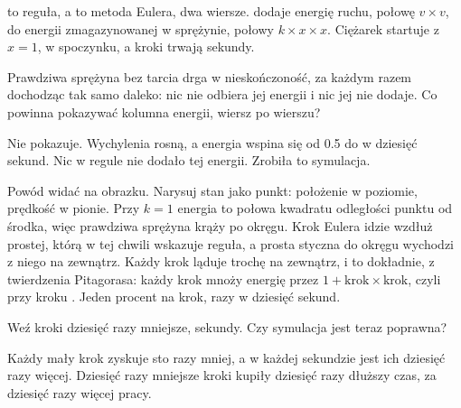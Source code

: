 
\noindent
{} to reguła, a  to metoda Eulera, dwa wiersze.
 dodaje energię ruchu, połowę $v \times v$, do energii
zmagazynowanej w sprężynie, połowy $k \times x \times x$. Ciężarek startuje z
$x = 1$, w spoczynku, a kroki trwają  sekundy.


\begin{think}
Prawdziwa sprężyna bez tarcia drga w nieskończoność, za każdym razem
dochodząc tak samo daleko: nic nie odbiera jej energii i nic jej nie dodaje.
Co powinna pokazywać kolumna energii, wiersz po wierszu?
\end{think}


\noindent
Nie pokazuje. Wychylenia rosną, a energia wspina się od \num{0.5} do
 w dziesięć sekund. Nic w regule nie dodało tej
energii. Zrobiła to symulacja.

Powód widać na obrazku. Narysuj stan jako punkt: położenie w poziomie,
prędkość w pionie. Przy $k = 1$ energia to połowa kwadratu odległości punktu
od środka, więc prawdziwa sprężyna krąży po okręgu. Krok Eulera idzie wzdłuż
prostej, którą w tej chwili wskazuje reguła, a prosta styczna do okręgu
wychodzi z niego na zewnątrz. Każdy krok ląduje trochę na zewnątrz, i to
dokładnie, z twierdzenia Pitagorasa: każdy krok mnoży energię przez
$1 + \text{krok} \times \text{krok}$, czyli  przy
kroku . Jeden procent na krok, 
razy w dziesięć sekund.

\begin{think}
Weź kroki dziesięć razy mniejsze,  sekundy. Czy symulacja
jest teraz poprawna?
\end{think}
Każdy mały krok zyskuje sto razy mniej, a w każdej sekundzie jest ich
dziesięć razy więcej. Dziesięć razy mniejsze kroki kupiły dziesięć razy
dłuższy czas, za dziesięć razy więcej pracy.

